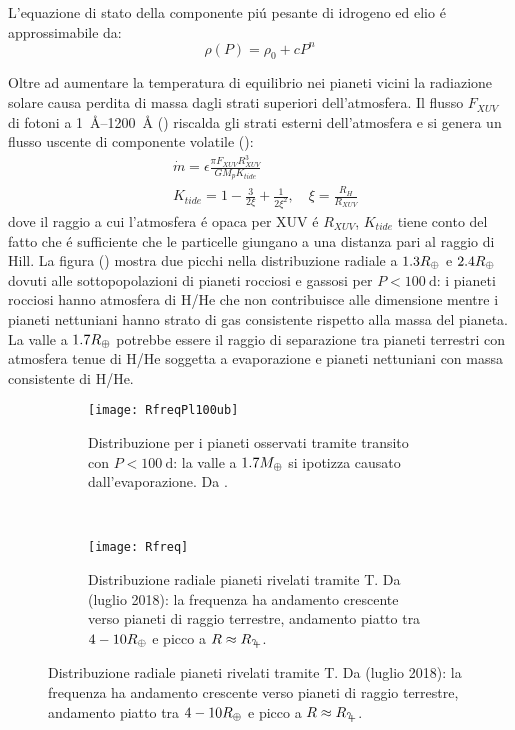 L'equazione di stato della componente pi\'u pesante di idrogeno ed elio \'e approssimabile da:
\begin{equation}
\rho(P)=\rho_0+cP^n
\end{equation}

\clearpage

Oltre ad aumentare la temperatura di equilibrio nei pianeti vicini la radiazione solare causa perdita di massa dagli strati superiori dell'atmosfera. Il flusso $F_{XUV}$ di fotoni a \SIrange{1}{1200}{\angstrom} (\cite{ribas2005evolution}) riscalda gli strati esterni dell'atmosfera e si genera un flusso uscente di componente volatile (\cite{lopez2013role}):
\begin{align}
&\dot{m}=\epsilon\frac{\pi F_{XUV}R_{XUV}^3}{GM_pK_{tide}}\\
&K_{tide}=1-\frac{3}{2\xi}+\frac{1}{2\xi^2},\quad\xi=\frac{R_H}{R_{XUV}}
\end{align}
dove il raggio a cui l'atmosfera \'e opaca per XUV \'e $R_{XUV}$, $K_{tide}$ tiene conto del fatto che \'e sufficiente che le particelle giungano a una distanza pari al raggio di Hill.
La figura () mostra due picchi nella distribuzione radiale a $1.3R_{\oplus}{}$ e $2.4R_{\oplus}{}$ dovuti alle sottopopolazioni di pianeti rocciosi e gassosi per $P<\SI{100}{\day}$: i pianeti rocciosi hanno atmosfera di H/He che non contribuisce alle dimensione mentre i pianeti nettuniani hanno strato di gas consistente rispetto alla massa del pianeta. La valle a $1.7R_{\oplus}{}$ potrebbe essere il raggio di separazione tra pianeti terrestri con atmosfera tenue di H/He soggetta a evaporazione e pianeti nettuniani con massa consistente di H/He.

\begin{figure}[!ht]
\begin{subfigure}[b]{0.49\textwidth}
	\centering \texttt{[image: RfreqPl100ub]} 
	\caption{Distribuzione per i pianeti osservati tramite transito con $P<\SI{100}{\day}$: la valle a $1.7M_{\oplus}{}$ si ipotizza causato dall'evaporazione. Da \cite{fulton2017california}.}\label{fig:RfreqPl100ub}
\end{subfigure}
~
\begin{subfigure}[b]{0.49\textwidth}
	\centering\texttt{[image: Rfreq]}\caption{Distribuzione radiale pianeti rivelati tramite T. Da \cite{exoplanet.eu} (luglio 2018): la frequenza ha andamento crescente verso pianeti di raggio terrestre, andamento piatto tra $4-10R_{\oplus}{}$ e picco a $R\approx\rjupiter{}$.}\label{fig:probvsR-T}
\end{subfigure}
\end{figure}

